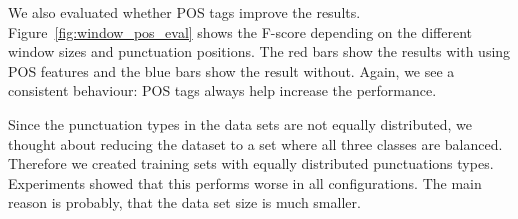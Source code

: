We also evaluated whether POS tags improve the results.
Figure~\ref{fig:window_pos_eval} shows the F-score depending on the different window sizes and punctuation positions.
The red bars show the results with using POS features and the blue bars show the result without.
Again, we see a consistent behaviour: POS tags always help increase the performance.

Since the punctuation types in the data sets are not equally distributed, we thought about reducing the dataset to a set where all three classes are balanced.
Therefore we created training sets with equally distributed punctuations types.
Experiments showed that this performs worse in all configurations.
The main reason is probably, that the data set size is much smaller.
